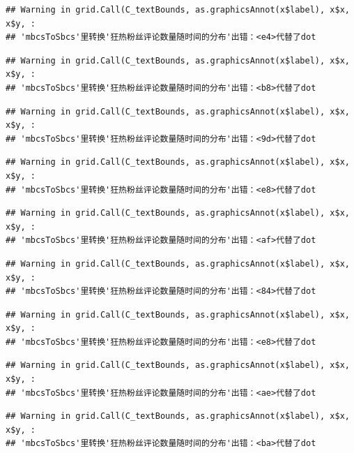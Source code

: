 \documentclass[
]{article}
\begin{document}
\begin{verbatim}
## Warning in grid.Call(C_textBounds, as.graphicsAnnot(x$label), x$x, x$y, :
## 'mbcsToSbcs'里转换'狂热粉丝评论数量随时间的分布'出错：<e4>代替了dot
\end{verbatim}

\begin{verbatim}
## Warning in grid.Call(C_textBounds, as.graphicsAnnot(x$label), x$x, x$y, :
## 'mbcsToSbcs'里转换'狂热粉丝评论数量随时间的分布'出错：<b8>代替了dot
\end{verbatim}

\begin{verbatim}
## Warning in grid.Call(C_textBounds, as.graphicsAnnot(x$label), x$x, x$y, :
## 'mbcsToSbcs'里转换'狂热粉丝评论数量随时间的分布'出错：<9d>代替了dot
\end{verbatim}

\begin{verbatim}
## Warning in grid.Call(C_textBounds, as.graphicsAnnot(x$label), x$x, x$y, :
## 'mbcsToSbcs'里转换'狂热粉丝评论数量随时间的分布'出错：<e8>代替了dot
\end{verbatim}

\begin{verbatim}
## Warning in grid.Call(C_textBounds, as.graphicsAnnot(x$label), x$x, x$y, :
## 'mbcsToSbcs'里转换'狂热粉丝评论数量随时间的分布'出错：<af>代替了dot
\end{verbatim}

\begin{verbatim}
## Warning in grid.Call(C_textBounds, as.graphicsAnnot(x$label), x$x, x$y, :
## 'mbcsToSbcs'里转换'狂热粉丝评论数量随时间的分布'出错：<84>代替了dot
\end{verbatim}

\begin{verbatim}
## Warning in grid.Call(C_textBounds, as.graphicsAnnot(x$label), x$x, x$y, :
## 'mbcsToSbcs'里转换'狂热粉丝评论数量随时间的分布'出错：<e8>代替了dot
\end{verbatim}

\begin{verbatim}
## Warning in grid.Call(C_textBounds, as.graphicsAnnot(x$label), x$x, x$y, :
## 'mbcsToSbcs'里转换'狂热粉丝评论数量随时间的分布'出错：<ae>代替了dot
\end{verbatim}

\begin{verbatim}
## Warning in grid.Call(C_textBounds, as.graphicsAnnot(x$label), x$x, x$y, :
## 'mbcsToSbcs'里转换'狂热粉丝评论数量随时间的分布'出错：<ba>代替了dot
\end{verbatim}
\end{document}
